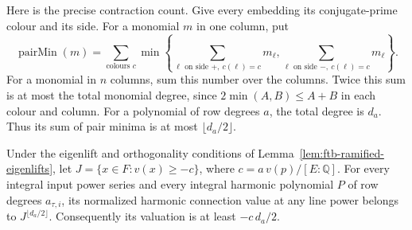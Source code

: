 Here is the precise contraction count.
Give every embedding its conjugate-prime colour and its side.
For a monomial \(m\) in one column, put
\[
 \operatorname{pairMin}(m)=
  \sum_{\text{colours }c}
   \min\left\{\sum_{\ell\text{ on side }+,\ c(\ell)=c}m_\ell,
              \sum_{\ell\text{ on side }-,\ c(\ell)=c}m_\ell\right\}.
\]
For a monomial in \(n\) columns, sum this number over the columns.
Twice this sum is at most the total monomial degree, since
\(2\min(A,B)\le A+B\) in each colour and column.
For a polynomial of row degrees \(a\), the total degree is \(d_a\).
Thus its sum of pair minima is at most \(\lfloor d_a/2\rfloor\).

\begin{srlemma}\label{lem:ftb-paired-connection}
Under the eigenlift and orthogonality conditions of
Lemma~\ref{lem:ftb-ramified-eigenlifts}, let
\(J=\{x\in F:v(x)\ge-c\}\), where
\(c=a\,v(p)/[E:\mathbb Q]\).
For every integral input power series and every integral harmonic
polynomial \(P\) of row degrees \(a_{\tau,i}\), its normalized
harmonic connection value at any line power belongs to
\(J^{\lfloor d_a/2\rfloor}\).
Consequently its valuation is at least \(-c\,d_a/2\).
\end{srlemma}
